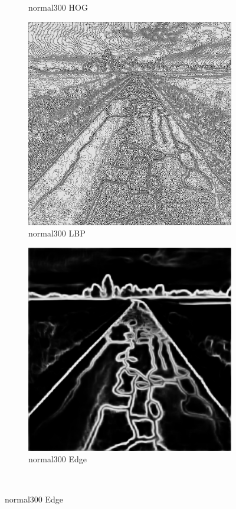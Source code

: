 \documentclass[a4paper, 10pt]{article}
\begin{document}
\begin{figure}[htbp]
\begin{subfigure}{0.24\textwidth}
			\caption*{normal300 HOG}
			\label{fig: normal300 HOG}
		\end{subfigure}	
		\begin{subfigure}{0.24\textwidth}
			\includegraphics[width=\linewidth]{picture/alldata_lbp/normal300}
			\caption*{normal300 LBP}
			\label{fig: normal300 LBP}
		\end{subfigure}
		\begin{subfigure}{0.24\textwidth}
			\includegraphics[width=\linewidth]{picture/alldata_edge/normal300}
			\caption*{normal300 Edge}
			\label{fig: normal300 Edge}
		\end{subfigure} \\
		

\end{figure}
\end{document}
